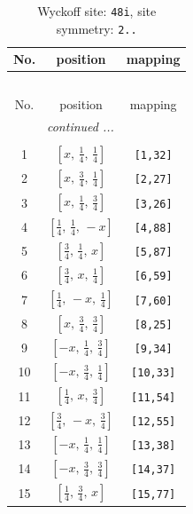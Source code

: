 \documentclass[fleqn,8pt]{jsarticle}
\begin{document}
\begin{longtable}{ccc}
\caption{Wyckoff site: {\tt 48i}, site symmetry: {\tt 2..}}
 \\
 \hline \hline
No. & position & mapping \\ \hline \endfirsthead

\multicolumn{2}{l}{\tablename\ \thetable{}} \\
 \hline \hline
No. & position & mapping \\ \hline \endhead

 \hline \hline
\multicolumn{2}{r}{\footnotesize\it continued ...} \\ \endfoot

 \hline \hline
\multicolumn{2}{r}{} \\ \endlastfoot

1 & $\left[ x,\, \frac{1}{4},\, \frac{1}{4} \right]$ & {\tt [1,32]} \\ \hline
2 & $\left[ x,\, \frac{3}{4},\, \frac{1}{4} \right]$ & {\tt [2,27]} \\ \hline
3 & $\left[ x,\, \frac{1}{4},\, \frac{3}{4} \right]$ & {\tt [3,26]} \\ \hline
4 & $\left[ \frac{1}{4},\, \frac{1}{4},\, - x \right]$ & {\tt [4,88]} \\ \hline
5 & $\left[ \frac{3}{4},\, \frac{1}{4},\, x \right]$ & {\tt [5,87]} \\ \hline
6 & $\left[ \frac{3}{4},\, x,\, \frac{1}{4} \right]$ & {\tt [6,59]} \\ \hline
7 & $\left[ \frac{1}{4},\, - x,\, \frac{1}{4} \right]$ & {\tt [7,60]} \\ \hline
8 & $\left[ x,\, \frac{3}{4},\, \frac{3}{4} \right]$ & {\tt [8,25]} \\ \hline
9 & $\left[ - x,\, \frac{1}{4},\, \frac{3}{4} \right]$ & {\tt [9,34]} \\ \hline
10 & $\left[ - x,\, \frac{3}{4},\, \frac{1}{4} \right]$ & {\tt [10,33]} \\ \hline
11 & $\left[ \frac{1}{4},\, x,\, \frac{3}{4} \right]$ & {\tt [11,54]} \\ \hline
12 & $\left[ \frac{3}{4},\, - x,\, \frac{3}{4} \right]$ & {\tt [12,55]} \\ \hline
13 & $\left[ - x,\, \frac{1}{4},\, \frac{1}{4} \right]$ & {\tt [13,38]} \\ \hline
14 & $\left[ - x,\, \frac{3}{4},\, \frac{3}{4} \right]$ & {\tt [14,37]} \\ \hline
15 & $\left[ \frac{1}{4},\, \frac{3}{4},\, x \right]$ & {\tt [15,77]} \\ \hline

\end{longtable}
\end{document}
